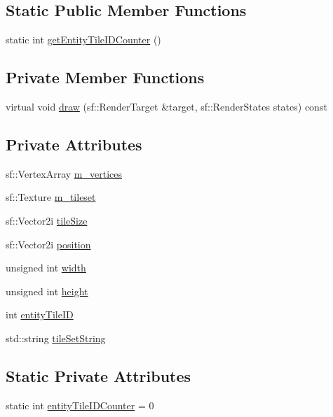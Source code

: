 \subsection*{Static Public Member Functions}
\begin{DoxyCompactItemize}
\item 
static int \mbox{\hyperlink{class_entity_tile_acabd6691ddcf65a812c38e86e12e28e7}{get\+Entity\+Tile\+I\+D\+Counter}} ()
\end{DoxyCompactItemize}
\subsection*{Private Member Functions}
\begin{DoxyCompactItemize}
\item 
virtual void \mbox{\hyperlink{class_entity_tile_a1d61eb82fed61b1c7aebc54249bd7c80}{draw}} (sf\+::\+Render\+Target \&target, sf\+::\+Render\+States states) const
\end{DoxyCompactItemize}
\subsection*{Private Attributes}
\begin{DoxyCompactItemize}
\item 
sf\+::\+Vertex\+Array \mbox{\hyperlink{class_entity_tile_a23eae4039b6b9fd344b9e36c34f9c5f9}{m\+\_\+vertices}}
\item 
sf\+::\+Texture \mbox{\hyperlink{class_entity_tile_a56d45f31668b3ff5934b684dce65f1d7}{m\+\_\+tileset}}
\item 
sf\+::\+Vector2i \mbox{\hyperlink{class_entity_tile_ab2b227fcf7beb0bd6bc40ba2cdf71643}{tile\+Size}}
\item 
sf\+::\+Vector2i \mbox{\hyperlink{class_entity_tile_acd604627c6c2c587a2bb4201bca9b0a4}{position}}
\item 
unsigned int \mbox{\hyperlink{class_entity_tile_a8e83db5f6f4fcabafca37d2a24714676}{width}}
\item 
unsigned int \mbox{\hyperlink{class_entity_tile_af102153f8a56f40d2cec1d53781bc3da}{height}}
\item 
int \mbox{\hyperlink{class_entity_tile_a12416c687d821f5c9d8272b94c5764d4}{entity\+Tile\+ID}}
\item 
std\+::string \mbox{\hyperlink{class_entity_tile_a4cb87a476e5125f272fc704cf51fabb7}{tile\+Set\+String}}
\end{DoxyCompactItemize}
\subsection*{Static Private Attributes}
\begin{DoxyCompactItemize}
\item 
static int \mbox{\hyperlink{class_entity_tile_a48bfcc60158b629788db1357707a9614}{entity\+Tile\+I\+D\+Counter}} = 0
\end{DoxyCompactItemize}


